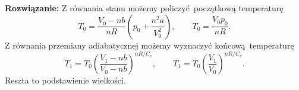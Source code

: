 \documentclass[11pt,a4paper]{article}
\begin{document}
\vskip 10pt
\textbf{Rozwiązanie:}
Z równania stanu możemy policzyć początkową temperaturę
\begin{equation}
	T_0 = \frac{V_0-nb}{nR}\left(p_0 + \frac{n^2 a}{V_0^2} \right), \qquad T_0 = \frac{V_0 p_0}{nR}.
\end{equation}
Z równania przemiany adiabatycznej możemy wyznaczyć końcową temperaturę
\begin{equation}
	T_1 = T_0 \left(\frac{V_1 - nb}{V_0 - nb} \right)^{nR/C_v}, \qquad T_1 = T_0 \left(\frac{V_1}{V_0} \right)^{nR/C_v}.
\end{equation}
Reszta to podstawienie wielkości.
\end{document}
